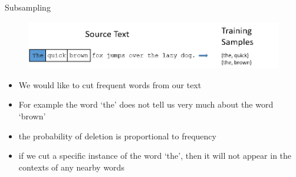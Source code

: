 \documentclass{beamer}
\begin{document}
	\begin{frame}{Subsampling}
		\begin{figure}
			\centering
			\includegraphics[width=\textwidth]{presentation_5_figures/training_data_cut}
		\end{figure}
		\begin{itemize}
			\item We would like to cut frequent words from our text
			\item For example the word `the' does not tell us very much about the word `brown'
			\item the probability of deletion is proportional to frequency
			\item if we cut a specific instance of the word `the', then it will not appear in the contexts of any nearby words
		\end{itemize}
	
	\end{frame}
	
\end{document}
